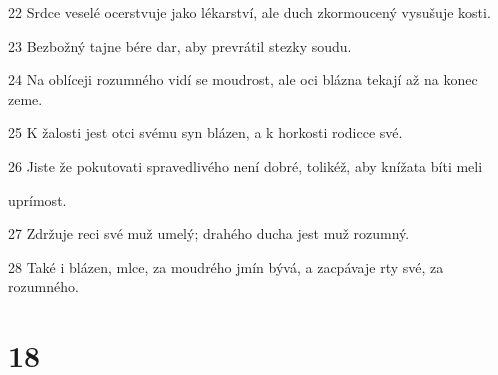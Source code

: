 \par 22 Srdce veselé ocerstvuje jako lékarství, ale duch zkormoucený vysušuje kosti.
\par 23 Bezbožný tajne bére dar, aby prevrátil stezky soudu.
\par 24 Na oblíceji rozumného vidí se moudrost, ale oci blázna tekají až na konec zeme.
\par 25 K žalosti jest otci svému syn blázen, a k horkosti rodicce své.
\par 26 Jiste že pokutovati spravedlivého není dobré, tolikéž, aby knížata bíti meli \par uprímost.
\par 27 Zdržuje reci své muž umelý; drahého ducha jest muž rozumný.
\par 28 Také i blázen, mlce, za moudrého jmín bývá, a zacpávaje rty své, za rozumného.

\chapter{18}

